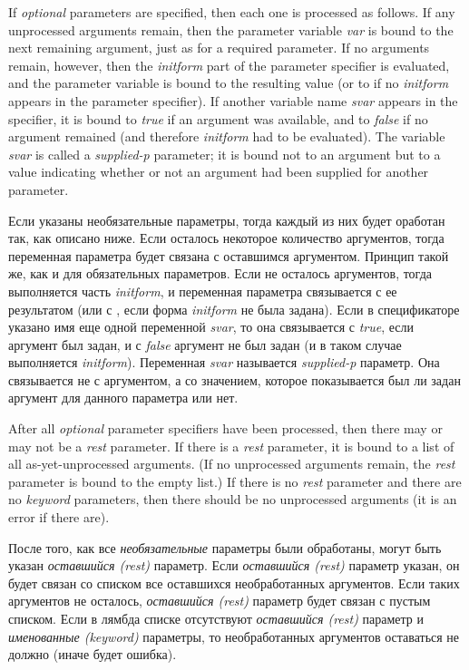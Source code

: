 If \textit{optional} parameters are specified, then each one is processed as
follows.  If any unprocessed arguments remain, then the parameter variable
\textit{var} is bound to the next remaining argument, just as for a required
parameter.  If no arguments remain, however, then the \textit{initform} part
of the parameter specifier is evaluated, and the parameter variable
is bound to the resulting value (or to {\false} if no \textit{initform} appears
in the parameter specifier).
If another variable name \textit{svar} appears in the specifier, it is bound
to \textit{true} if an argument was available, and to \textit{false} if no
argument remained (and therefore \textit{initform} had to be evaluated).
The variable \textit{svar} is called a \textit{supplied-p} parameter;
it is bound not to an argument but to a value indicating whether or not
an argument had been supplied for another parameter.

Если указаны необязательные параметры, тогда каждый из них будет оработан так,
как описано ниже. Если осталось некоторое количество аргументов, тогда
переменная параметра  будет связана с оставшимся аргументом. Принцип
такой же, как и для обязательных параметров. Если не осталось аргументов, тогда
выполняется часть \textit{initform}, и переменная
параметра связывается с ее результатом (или с {\false}, если форма
\textit{initform} не была задана).
Если в спецификаторе указано имя еще одной переменной \textit{svar}, то она
связывается с \textit{true}, если аргумент был задан, и с \textit{false}
аргумент не был задан (и в таком случае выполняется \textit{initform}).
Переменная \textit{svar} называется \textit{supplied-p} параметр. Она
связывается не с аргументом, а со значением, которое показывается был ли задан
аргумент для данного параметра или нет.

After all \textit{optional} parameter specifiers have been processed,
then there may or may not be a \textit{rest} parameter.
If there is a \textit{rest} parameter, it is bound to a list of all
as-yet-unprocessed arguments.  (If no unprocessed arguments remain,
the \textit{rest} parameter is bound to the empty list.)
If there is no \textit{rest} parameter and there are no \textit{keyword}
parameters,
then there should be no unprocessed arguments (it is an error if there are).

После того, как все \textit{необязательные} параметры были обработаны, могут
быть указан \textit{оставшийся (rest)} параметр.
Если \textit{оставшийся (rest)} параметр указан, он будет связан со списком все
оставшихся необработанных аргументов. Если таких аргументов не осталось,
\textit{оставшийся (rest)} параметр будет связан с пустым списком. Если в лямбда
списке отсутствуют \textit{оставшийся (rest)} параметр и \textit{именованные
  (keyword)} параметры, то необработанных аргументов оставаться не должно (иначе
будет ошибка).

